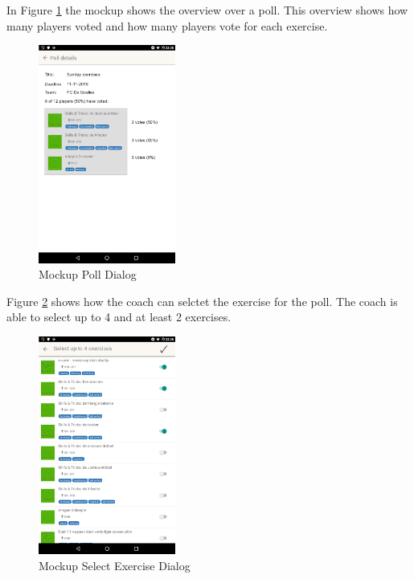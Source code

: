 In Figure \ref{fig:mockup_poll} the mockup shows the overview over a poll. This overview shows how many players voted and how many players vote for each exercise. 
\begin{figure}[H]
    \begin{center}
        \includegraphics[width=0.4\textwidth]{images/mockups/poll.png}
        \caption{Mockup Poll Dialog}
        \label{fig:mockup_poll}
    \end{center}
\end{figure}

Figure \ref{fig:mockup_select} shows how the coach can selctet the exercise for the poll. The coach is able to select up to 4 and at least 2 exercises. 
\begin{figure}[H]
    \begin{center}
        \includegraphics[width=0.4\textwidth]{images/mockups/select-exercises.png}
        \caption{Mockup Select Exercise Dialog}
        \label{fig:mockup_select}
    \end{center}
\end{figure}

